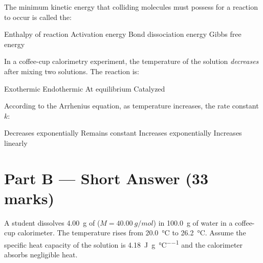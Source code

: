 \documentclass[addpoints]{exam}
\begin{document}
\begin{questions}
\question[1] The minimum kinetic energy that colliding molecules must possess for a reaction to
occur is called the:
\begin{choices}
    \choice Enthalpy of reaction
    \correctchoice Activation energy
    \choice Bond dissociation energy
    \choice Gibbs free energy
\end{choices}

\question[1] In a coffee-cup calorimetry experiment, the temperature of the solution
\textit{decreases} after mixing two solutions. The reaction is:
\begin{choices}
    \choice Exothermic
    \correctchoice Endothermic
    \choice At equilibrium
    \choice Catalyzed
\end{choices}

\question[1] According to the Arrhenius equation, as temperature increases, the rate constant
$k$:
\begin{choices}
    \choice Decreases exponentially
    \choice Remains constant
    \correctchoice Increases exponentially
    \choice Increases linearly
\end{choices}


\section*{Part B --- Short Answer (33 marks)}

\question A student dissolves \SI{4.00}{g} of  ($M = \SI{40.00}{g/mol}$) in
\SI{100.0}{g} of water in a coffee-cup calorimeter. The temperature rises from \SI{20.0}{\celsius}
to \SI{26.2}{\celsius}. Assume the specific heat capacity of the solution is
\SI{4.18}{J\per g\per\celsius} and the calorimeter absorbs negligible heat.
\end{questions}
\end{document}
